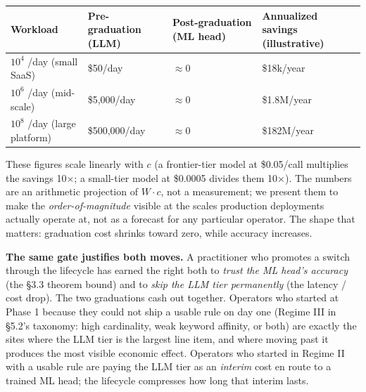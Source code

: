 {\def\LTcaptype{none} %
\begin{longtable}[]{@{}
  >{\raggedright\arraybackslash}p{}
  >{\raggedleft\arraybackslash}p{}
  >{\raggedleft\arraybackslash}p{}
  >{\raggedleft\arraybackslash}p{}@{}}
\toprule\noalign{}
\begin{minipage}[b]{\linewidth}\raggedright
Workload
\end{minipage} & \begin{minipage}[b]{\linewidth}\raggedleft
Pre-graduation (LLM)
\end{minipage} & \begin{minipage}[b]{\linewidth}\raggedleft
Post-graduation (ML head)
\end{minipage} & \begin{minipage}[b]{\linewidth}\raggedleft
Annualized savings (illustrative)
\end{minipage} \\
\midrule\noalign{}
\endhead
\bottomrule\noalign{}
\endlastfoot
\(10^4\) /day (small SaaS) & \$50/day & \(\approx 0\) & \$18k/year \\
\(10^6\) /day (mid-scale) & \$5,000/day & \(\approx 0\) & \$1.8M/year \\
\(10^8\) /day (large platform) & \$500,000/day & \(\approx 0\) &
\$182M/year \\
\end{longtable}
}

These figures scale linearly with \(c\) (a frontier-tier model at
\$0.05/call multiplies the savings 10×; a small-tier model at \$0.0005
divides them 10×). The numbers are an arithmetic projection of
\(W \cdot c\), not a measurement; we present them to make the
\emph{order-of-magnitude} visible at the scales production deployments
actually operate at, not as a forecast for any particular operator. The
shape that matters: graduation cost shrinks toward zero, while accuracy
increases.

\textbf{The same gate justifies both moves.} A practitioner who promotes
a switch through the lifecycle has earned the right both to \emph{trust
the ML head's accuracy} (the §3.3 theorem bound) and to \emph{skip the
LLM tier permanently} (the latency / cost drop). The two graduations
cash out together. Operators who started at Phase 1 because they could
not ship a usable rule on day one (Regime III in §5.2's taxonomy: high
cardinality, weak keyword affinity, or both) are exactly the sites where
the LLM tier is the largest line item, and where moving past it produces
the most visible economic effect. Operators who started in Regime II
with a usable rule are paying the LLM tier as an \emph{interim} cost en
route to a trained ML head; the lifecycle compresses how long that
interim lasts.

